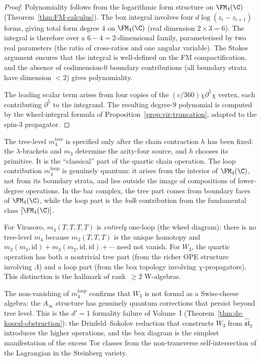 \begin{proof}
Polynomiality follows from the logarithmic form structure on
$\FM_4(\C)$ (Theorem~\ref{thm:FM-calculus}). The box integral
involves four $d\log(z_i - z_{i+1})$ forms, giving total
form degree $4$ on $\FM_4(\C)$ (real dimension $2 \times 3 = 6$).
The integral is therefore over a $6-4 = 2$-dimensional family,
parameterised by two real parameters (the ratio of cross-ratios
and one angular variable). The Stokes argument ensures
that the integral is well-defined on the FM compactification,
and the absence of codimension-$0$ boundary contributions
(all boundary strata have dimension $< 2$) gives polynomiality.

The leading scalar term arises from four copies of the
$(c/360)\chi\partial^5\chi$ vertex, each contributing
$\partial^5$ to the integrand. The resulting degree-$9$
polynomial is computed by the wheel-integral formula of
Proposition~\ref{prop:vir-truncation}, adapted to the
spin-$3$ propagator.
\end{proof}

\begin{remark}
\label{rem:tree-vs-loop}
The tree-level $m_4^{\mathrm{tree}}$ is specified
only after the chain contraction \(h\) has been fixed: the
\(\lambda\)-brackets and \(m_3\) determine the arity-four source,
and \(h\) chooses its primitive. It is the ``classical'' part of the
quartic chain operation. The loop
contribution $m_4^{\mathrm{loop}}$ is genuinely quantum: it
arises from the interior of $\FM_4(\C)$, not from its boundary
strata, and lies outside the image of compositions of lower-degree
operations. In the bar complex, the tree part comes from
boundary faces of $\FM_4(\C)$, while the loop part is the
\emph{bulk} contribution from the fundamental class
$[\FM_4(\C)]$.

For Virasoro, $m_4(T,T,T,T)$ is \emph{entirely} one-loop
(the wheel diagram): there is no tree-level $m_4$ because
$m_3(T,T,T)$ is the unique homotopy and $m_2(m_3, \mathrm{id})
+ m_3(m_2, \mathrm{id}, \mathrm{id}) + \cdots$ need not vanish.
For $W_3$, the quartic operation has both a nontrivial tree
part (from the richer OPE structure involving $\Lambda$) and
a loop part (from the box topology involving $\chi$-propagators).
This distinction is the hallmark of rank~$\ge 2$ W-algebras.
\end{remark}

\begin{remark}
\label{rem:m4-non-formality}
The non-vanishing of $m_4^{\mathrm{loop}}$ confirms that $W_3$
is not formal as a Swiss-cheese algebra: the $A_\infty$ structure
has genuinely quantum corrections that persist beyond tree level.
This is the $d' = 1$ formality failure of Volume~I
(Theorem~\ref{thm:ds-koszul-obstruction}): the Drinfeld--Sokolov
reduction that constructs $W_3$ from $\widehat{\mathfrak{sl}}_3$
introduces the higher operations, and the box diagram is the
simplest manifestation of the excess Tor classes from the
non-transverse self-intersection of the Lagrangian in the
Steinberg variety.
\end{remark}

